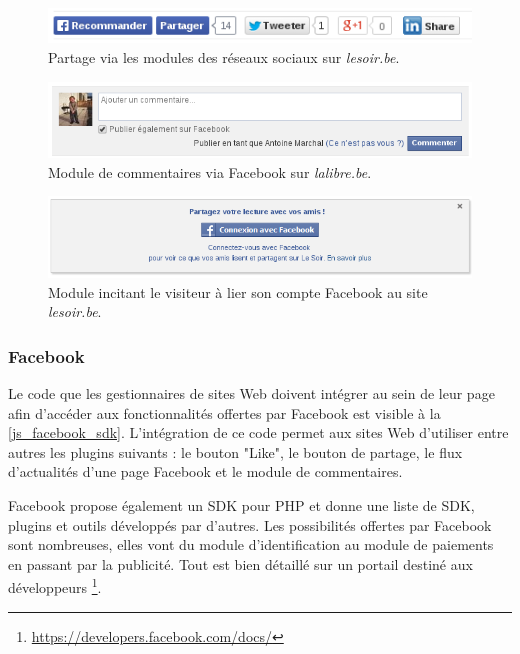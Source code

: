 \begin{figure}[h]
	\centering
	\includegraphics[scale=0.55]{figures/modules_sociaux_lesoir.png}
	\caption{\label{etag}Partage via les modules des réseaux sociaux sur \textit{lesoir.be}.}
\end{figure}

\begin{figure}[h]
	\centering
	\includegraphics[scale=0.55]{figures/module_facebook_lalibre.png}
	\caption{\label{etag}Module de commentaires via Facebook sur \textit{lalibre.be}.}
\end{figure}

\begin{figure}[h]
	\centering
	\includegraphics[scale=0.55]{figures/module_facebook_lesoir.png}
	\caption{\label{etag}Module incitant le visiteur à lier son compte Facebook au site \textit{lesoir.be}.}
\end{figure}

\subsubsection{Facebook}
Le code que les gestionnaires de sites Web doivent intégrer au sein de leur page afin d'accéder aux fonctionnalités offertes par Facebook \cite{javascript_facebook_sdk} est visible à la \autoref{js_facebook_sdk}. L'intégration de ce code permet aux sites Web d'utiliser entre autres les plugins suivants : le bouton "Like", le bouton de partage, le flux d'actualités d'une page Facebook et le module de commentaires.

Facebook propose également un SDK pour PHP et donne une liste de SDK, plugins et outils développés par d'autres. Les possibilités offertes par Facebook sont nombreuses, elles vont du module d'identification au module de paiements en passant par la publicité. Tout est bien détaillé sur un portail destiné aux développeurs \footnote{\url{https://developers.facebook.com/docs/}}.

